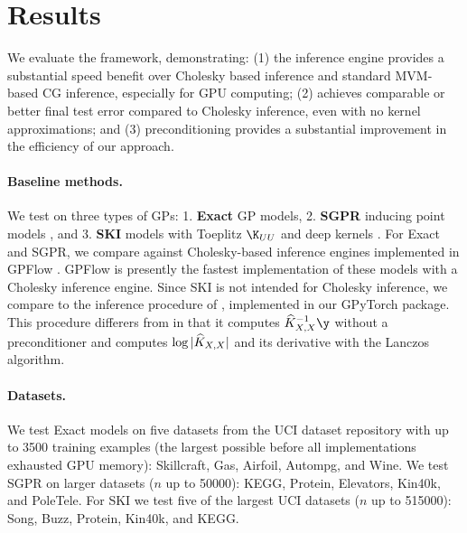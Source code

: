 \section{Results}

We evaluate the \mmacro{} framework, demonstrating: (1) the \mmacro{} inference engine provides a substantial speed benefit over Cholesky based inference and standard MVM-based CG inference, especially for GPU computing; (2) \mmacro{} achieves comparable or better final test error compared to Cholesky inference, even with no kernel approximations; and (3) preconditioning provides a substantial improvement in the efficiency of our approach.

\paragraph{Baseline methods.} We test \mmacro{} on three types of GPs:
1. {\bf Exact} GP models,
2. {\bf SGPR} inducing point models \cite{titsias2009variational,hensman2013gaussian},
and 3. {\bf SKI} models with Toeplitz $\K_{UU}$ and deep kernels \cite{wilson2015kernel,wilson2016deep}.
For Exact and SGPR, we compare \mmacro{} against Cholesky-based inference engines implemented in GPFlow \cite{matthews2017gpflow}.
GPFlow is presently the fastest implementation of these models with a Cholesky inference engine.
Since SKI is not intended for Cholesky inference, we compare \mmacro{} to the inference procedure of \citet{dong2017scalable}, implemented in our GPyTorch package.
This procedure differers from \mmacro{} in that it computes $\trainK^{-1} \y$ without a preconditioner and computes $\log \vert \widehat{K}_{X,X} \vert$ and its derivative with the Lanczos algorithm.

\paragraph{Datasets.}
We test Exact models on five datasets from the UCI dataset repository \cite{asuncion2007uci} with up to 3500 training examples (the largest possible before all implementations exhausted GPU memory): Skillcraft, Gas, Airfoil, Autompg, and Wine.
We test SGPR on larger datasets ($n$ up to 50000): KEGG, Protein, Elevators, Kin40k, and PoleTele.
For SKI we test five of the largest UCI datasets ($n$ up to 515000): Song, Buzz, Protein, Kin40k, and KEGG.

